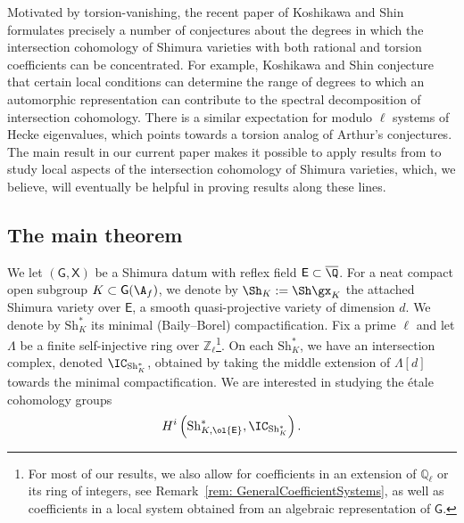 \documentclass[letterpaper,11pt]{amsart}
\begin{document}
Motivated by torsion-vanishing, the recent paper of Koshikawa and Shin \cite{KoshikawaShin} formulates precisely a number of conjectures about the degrees in which the intersection cohomology of Shimura varieties with both rational and torsion coefficients can be concentrated. For example, Koshikawa and Shin conjecture that certain local conditions can determine the range of degrees to which an automorphic representation can contribute to the spectral decomposition of intersection cohomology. There is a similar expectation for modulo $\ell$ systems of Hecke eigenvalues, which points towards a torsion analog of Arthur's conjectures. The main result in our current paper makes it possible to apply results from \cite{FSGeomLLC,Zhu} to study local aspects of the intersection cohomology of Shimura varieties, which, we believe, will eventually be helpful in proving results along these lines. 


\subsection{The main theorem}

We let $(\mathsf{G}, \mathsf{X})$ be a Shimura datum with reflex field $\mathsf{E}\subset \overline{\Q}$. For a neat compact open subgroup $K\subset \mathsf{G}(\A_f)$, we denote by $\Sh_K:=\Sh\gx_K$ the attached Shimura variety over $\mathsf{E}$, a smooth quasi-projective variety of dimension $d$. We denote by $\mathrm{Sh}^*_K$ its minimal (Baily--Borel) compactification. Fix a prime $\ell$ and let $\Lambda$ be a finite self-injective ring over $\mathbb{Z}_{\ell}$\footnote{For most of our results, we also allow for coefficients in an extension of $\mathbb{Q}_{\ell}$ or its ring of integers, see Remark~\ref{rem: GeneralCoefficientSystems}, as well as coefficients in a local system obtained from an algebraic representation of $\mathsf{G}$.}. On each $\mathrm{Sh}^*_K$,  we have an intersection complex, denoted $\IC_{\mathrm{Sh}_K^*}$, obtained by taking the middle extension of $\Lambda[d]$ towards the minimal compactification. We are interested in studying the \'etale cohomology groups 
\begin{equation}\label{eq: classical IC}
H^i\left(\mathrm{Sh}^*_{K, \ol{\mathsf{E}}}, 
\IC_{\mathrm{Sh}^*_{K}}\right).
\end{equation} 
\end{document}

